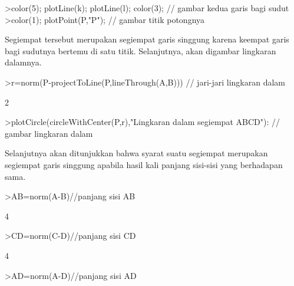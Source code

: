 \documentclass[12pt,arial,letterpaper]{book}
\begin{document}
\begin{eulercomment}
\begin{eulercomment}
\begin{eulercomment}
\begin{eulercomment}
\begin{eulercomment}
\begin{eulercomment}
\begin{eulercomment}
\begin{eulercomment}
\begin{eulercomment}
\begin{eulercomment}
\begin{eulercomment}
\begin{eulercomment}
\begin{eulercomment}
\begin{eulercomment}
\begin{eulercomment}
\begin{eulercomment}
\begin{eulercomment}
\begin{eulercomment}
\begin{eulercomment}
\begin{eulercomment}
\begin{eulercomment}
\begin{eulercomment}
\begin{eulercomment}
\begin{eulercomment}
\begin{eulercomment}
\begin{eulercomment}
\begin{eulercomment}
\begin{eulercomment}
\begin{eulercomment}
\begin{eulercomment}
\begin{eulercomment}
\begin{eulercomment}
\begin{eulerprompt}
>color(5); plotLine(k); plotLine(l); color(3); // gambar kedua garis bagi sudut
>color(1); plotPoint(P,"P"); // gambar titik potongnya
\end{eulerprompt}
\begin{eulercomment}
Segiempat tersebut merupakan segiempat garis singgung karena keempat
garis bagi sudutnya bertemu di satu titik.  Selanjutnya, akan digambar
lingkaran dalamnya.
\end{eulercomment}
\begin{eulerprompt}
>r=norm(P-projectToLine(P,lineThrough(A,B))) // jari-jari lingkaran dalam
\end{eulerprompt}
\begin{euleroutput}
  2
\end{euleroutput}
\begin{eulerprompt}
>plotCircle(circleWithCenter(P,r),"Lingkaran dalam segiempat ABCD"): // gambar lingkaran dalam
\end{eulerprompt}
\begin{eulercomment}
Selanjutnya akan ditunjukkan bahwa syarat suatu segiempat merupakan
segiempat garis singgung apabila hasil kali panjang sisi-sisi yang
berhadapan sama.
\end{eulercomment}
\begin{eulerprompt}
>AB=norm(A-B)//panjang sisi AB
\end{eulerprompt}
\begin{euleroutput}
  4
\end{euleroutput}
\begin{eulerprompt}
>CD=norm(C-D)//panjang sisi CD
\end{eulerprompt}
\begin{euleroutput}
  4
\end{euleroutput}
\begin{eulerprompt}
>AD=norm(A-D)//panjang sisi AD
\end{eulerprompt}

\end{eulercomment}
\end{eulercomment}
\end{eulercomment}
\end{eulercomment}
\end{eulercomment}
\end{eulercomment}
\end{eulercomment}
\end{eulercomment}
\end{eulercomment}
\end{eulercomment}
\end{eulercomment}
\end{eulercomment}
\end{eulercomment}
\end{eulercomment}
\end{eulercomment}
\end{eulercomment}
\end{eulercomment}
\end{eulercomment}
\end{eulercomment}
\end{eulercomment}
\end{eulercomment}
\end{eulercomment}
\end{eulercomment}
\end{eulercomment}
\end{eulercomment}
\end{eulercomment}
\end{eulercomment}
\end{eulercomment}
\end{eulercomment}
\end{eulercomment}
\end{eulercomment}
\end{eulercomment}
\end{document}
